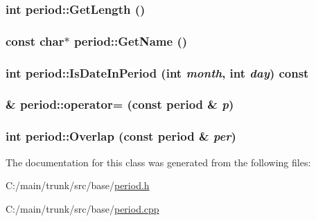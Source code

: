 \label{classperiod_a44a437719b012f10621691d2249068a1}
\hypertarget{classperiod_a1bb8fa04824fbe9309a2debd265c7b90}{
\subsubsection[{GetLength}]{\setlength{\rightskip}{0pt plus 5cm}int period::GetLength ()}}
\label{classperiod_a1bb8fa04824fbe9309a2debd265c7b90}
\hypertarget{classperiod_a8136239b5db53fc0321d3d7a52c015ac}{
\subsubsection[{GetName}]{\setlength{\rightskip}{0pt plus 5cm}const char$\ast$ period::GetName ()}}
\label{classperiod_a8136239b5db53fc0321d3d7a52c015ac}
\hypertarget{classperiod_a1036b3c6da47c233381926627e8b2e4e}{
\subsubsection[{IsDateInPeriod}]{\setlength{\rightskip}{0pt plus 5cm}int period::IsDateInPeriod (int {\em month}, \/  int {\em day}) const}}
\label{classperiod_a1036b3c6da47c233381926627e8b2e4e}
\hypertarget{classperiod_a977b1a065d2fac945da835e2baa1ce88}{
\subsubsection[{operator=}]{ \& period::operator= (const {\bf period} \& {\em p})}}
\label{classperiod_a977b1a065d2fac945da835e2baa1ce88}
\hypertarget{classperiod_a8cf7f0182e0718ee31c366981beda3c6}{
\subsubsection[{Overlap}]{\setlength{\rightskip}{0pt plus 5cm}int period::Overlap (const {\bf period} \& {\em per})}}
\label{classperiod_a8cf7f0182e0718ee31c366981beda3c6}


The documentation for this class was generated from the following files:\begin{DoxyCompactItemize}
\item 
C:/main/trunk/src/base/\hyperlink{period_8h}{period.h}\item 
C:/main/trunk/src/base/\hyperlink{period_8cpp}{period.cpp}\end{DoxyCompactItemize}
